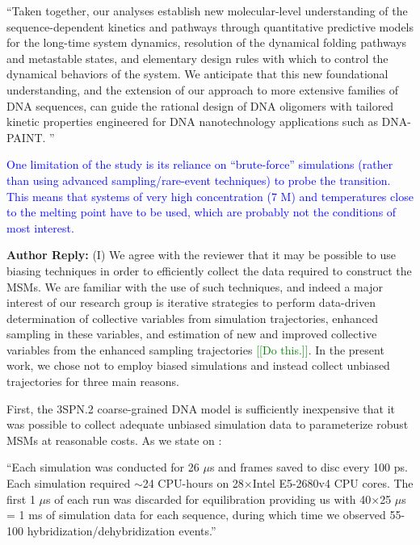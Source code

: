 \documentclass[11pt,a4paper]{letter} %
\newcommand*{\rood}[1]{{\color{red}{#1}}}
\newcommand*{\noteg}[1]{\textcolor{green}{[[#1]]}}		%
\newcommand*{\noter}[1]{{\color{red}{[[#1]]}}}
\begin{document}
``Taken together, our analyses establish new molecular-level understanding of the sequence-dependent kinetics and pathways through quantitative predictive models for the long-time system dynamics, resolution of the dynamical folding pathways and metastable states, and elementary design rules with which to control the dynamical behaviors of the system. We anticipate that this new foundational understanding, and the extension of our approach to more extensive families of DNA sequences, can guide the rational design of DNA oligomers with tailored kinetic properties engineered for DNA nanotechnology applications such as DNA-PAINT. \citep{Shah2019, Strauss2020UpDNA-PAINT}'' 





\textcolor{blue}{One limitation of the study is its reliance on ``brute-force'' simulations (rather than using advanced sampling/rare-event techniques) to probe the transition. This means that systems of very high concentration (7 M) and temperatures close to the melting point have to be used, which are probably not the conditions of most interest.}

\textbf{Author Reply:}    (I) We agree with the reviewer that it may be possible to use biasing techniques in order to efficiently collect the data required to construct the MSMs. We are familiar with the use of such techniques, and indeed a major interest of our research group is iterative strategies to perform data-driven determination of collective variables from simulation trajectories, enhanced sampling in these variables, and estimation of new and improved collective variables from the enhanced sampling trajectories \noter{Add refs: 74, 66, 61, 60, 56, 44, 43 from https://www.ferglab.com/publications/} \noteg{Do this.}. In the present work, we chose not to employ biased simulations and instead collect unbiased trajectories for three main reasons. 

First, the 3SPN.2 coarse-grained DNA model is sufficiently inexpensive that it was possible to collect adequate unbiased simulation data to parameterize robust MSMs at reasonable costs. As we state on \rood{p.~7}: 

``Each simulation was conducted for 26 $\mu$s and frames saved to disc every 100 ps. Each simulation required $\sim$24 CPU-hours on 28$\times$Intel E5-2680v4 CPU cores. The first 1 $\mu$s of each run was discarded for equilibration providing us with 40$\times$25 $\mu$s = 1 ms of simulation data for each sequence, during which time we observed 55-100 hybridization/dehybridization events.''
\end{document}
